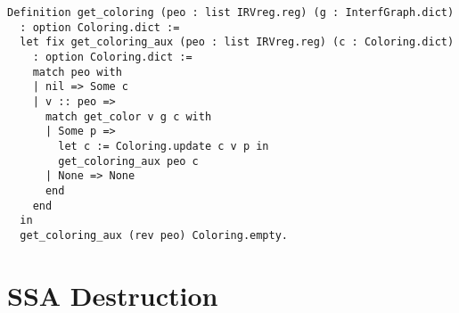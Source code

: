 \begin{lstlisting}[style=Rocq]
Definition get_coloring (peo : list IRVreg.reg) (g : InterfGraph.dict)
  : option Coloring.dict :=
  let fix get_coloring_aux (peo : list IRVreg.reg) (c : Coloring.dict)
    : option Coloring.dict :=
    match peo with
    | nil => Some c
    | v :: peo =>
      match get_color v g c with
      | Some p =>
        let c := Coloring.update c v p in
        get_coloring_aux peo c
      | None => None
      end
    end
  in
  get_coloring_aux (rev peo) Coloring.empty.
\end{lstlisting}

\section{SSA Destruction}
\label{sec:destruct}

